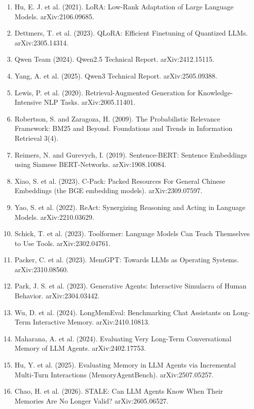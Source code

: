 \documentclass[10.5pt,a4paper,oneside]{report}
\begin{document}
\begin{enumerate}
\item Hu, E. J. et al. (2021). LoRA: Low-Rank Adaptation of Large Language Models. arXiv:\allowbreak{}2106.09685.
\item Dettmers, T. et al. (2023). QLoRA: Efficient Finetuning of Quantized LLMs. arXiv:\allowbreak{}2305.14314.
\item Qwen Team (2024). Qwen2.5 Technical Report. arXiv:\allowbreak{}2412.15115.
\item Yang, A. et al. (2025). Qwen3 Technical Report. arXiv:\allowbreak{}2505.09388.
\item Lewis, P. et al. (2020). Retrieval-Augmented Generation for Knowledge-Intensive NLP Tasks. arXiv:\allowbreak{}2005.11401.
\item Robertson, S. and Zaragoza, H. (2009). The Probabilistic Relevance Framework: BM25 and Beyond. Foundations and Trends in Information Retrieval 3(4).
\item Reimers, N. and Gurevych, I. (2019). Sentence-BERT: Sentence Embeddings using Siamese BERT-Networks. arXiv:\allowbreak{}1908.10084.
\item Xiao, S. et al. (2023). C-Pack: Packed Resources For General Chinese Embeddings (the BGE embedding models). arXiv:\allowbreak{}2309.07597.
\item Yao, S. et al. (2022). ReAct: Synergizing Reasoning and Acting in Language Models. arXiv:\allowbreak{}2210.03629.
\item Schick, T. et al. (2023). Toolformer: Language Models Can Teach Themselves to Use Tools. arXiv:\allowbreak{}2302.04761.
\item Packer, C. et al. (2023). MemGPT: Towards LLMs as Operating Systems. arXiv:\allowbreak{}2310.08560.
\item Park, J. S. et al. (2023). Generative Agents: Interactive Simulacra of Human Behavior. arXiv:\allowbreak{}2304.03442.
\item Wu, D. et al. (2024). LongMemEval: Benchmarking Chat Assistants on Long-Term Interactive Memory. arXiv:\allowbreak{}2410.10813.
\item Maharana, A. et al. (2024). Evaluating Very Long-Term Conversational Memory of LLM Agents. arXiv:\allowbreak{}2402.17753.
\item Hu, Y. et al. (2025). Evaluating Memory in LLM Agents via Incremental Multi-Turn Interactions (MemoryAgentBench). arXiv:\allowbreak{}2507.05257.
\item Chao, H. et al. (2026). STALE: Can LLM Agents Know When Their Memories Are No Longer Valid? arXiv:\allowbreak{}2605.06527.

\end{enumerate}
\end{document}

